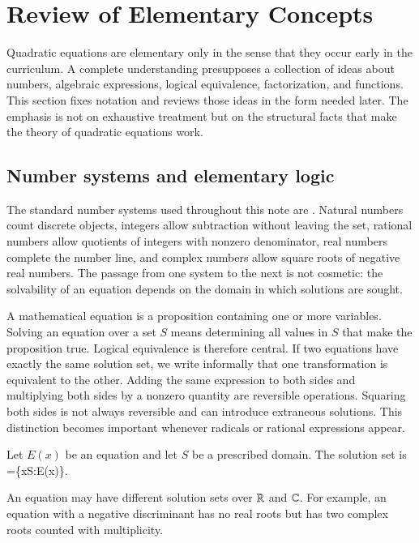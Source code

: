 \section{Review of Elementary Concepts}

Quadratic equations are elementary only in the sense that they occur early in the curriculum. A complete understanding presupposes a collection of ideas about numbers, algebraic expressions, logical equivalence, factorization, and functions. This section fixes notation and reviews those ideas in the form needed later. The emphasis is not on exhaustive treatment but on the structural facts that make the theory of quadratic equations work.

\subsection{Number systems and elementary logic}

The standard number systems used throughout this note are
\be
\N \subset \Z \subset \Q \subset \R \subset \C.
\ee
Natural numbers count discrete objects, integers allow subtraction without leaving the set, rational numbers allow quotients of integers with nonzero denominator, real numbers complete the number line, and complex numbers allow square roots of negative real numbers. The passage from one system to the next is not cosmetic: the solvability of an equation depends on the domain in which solutions are sought.

A mathematical equation is a proposition containing one or more variables. Solving an equation over a set $S$ means determining all values in $S$ that make the proposition true. Logical equivalence is therefore central. If two equations have exactly the same solution set, we write informally that one transformation is equivalent to the other. Adding the same expression to both sides and multiplying both sides by a nonzero quantity are reversible operations. Squaring both sides is not always reversible and can introduce extraneous solutions. This distinction becomes important whenever radicals or rational expressions appear.

\begin{definition}
Let $E(x)$ be an equation and let $S$ be a prescribed domain. The solution set is
\be
{}=\{x\in S:E(x)\}.
\ee
\end{definition}

\begin{remark}
An equation may have different solution sets over $\mathbb{R}$ and $\mathbb{C}$. For example, an equation with a negative discriminant has no real roots but has two complex roots counted with multiplicity.
\end{remark}

